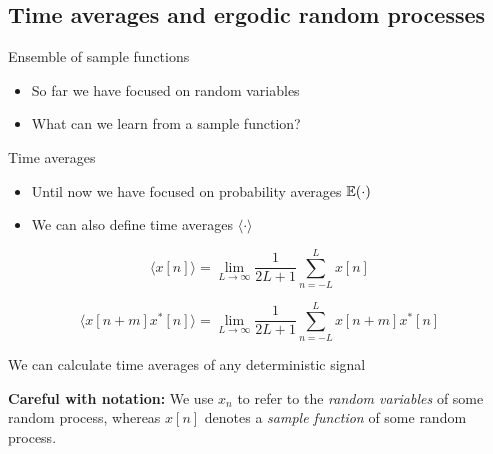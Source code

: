 \documentclass[10pt]{beamer}
\begin{document}
\subsection{Time averages and ergodic random processes}

\begin{frame}{Ensemble of sample functions}
\begin{itemize}
	\item So far we have focused on random variables
	\item What can we learn from a sample function?
\end{itemize}
\begin{center}
	\resizebox{0.9\linewidth}{!}{}
\end{center}
\end{frame}

%
\begin{frame}{Time averages}

\begin{itemize}
	\item Until now we have focused on probability averages $\operatorname{\mathbb{E}}(\cdot)$
	\item We can also define time averages $\langle\cdot\rangle$
\end{itemize}

\begin{equation*}
\langle x[n] \rangle = \lim_{L\to\infty}\frac{1}{2L + 1}\sum_{n=-L}^L x[n]
\end{equation*}

\begin{equation*}
\langle x[n+m]x^*[n] \rangle = \lim_{L\to\infty}\frac{1}{2L + 1}\sum_{n=-L}^L x[n+m]x^*[n]
\end{equation*}

We can calculate time averages of any deterministic signal

\begin{center}
	\resizebox{0.8\linewidth}{!}{}
\end{center}

\textbf{Careful with notation:} We use $x_n$ to refer to the \textit{random variables} of some random process, whereas $x[n]$ denotes a \textit{sample function} of some random process.

\end{frame}
\end{document}
